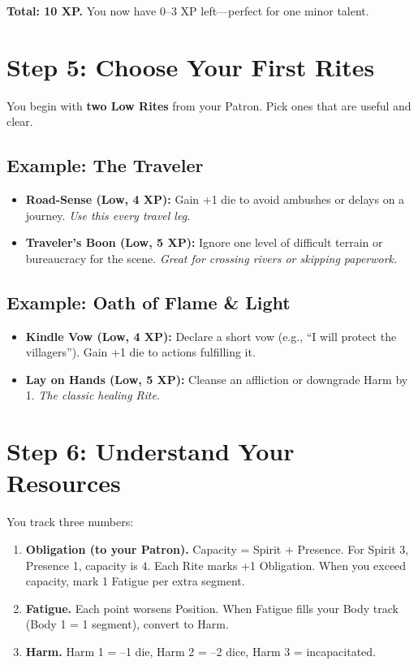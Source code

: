 \textbf{Total: 10 XP.} You now have 0--3 XP left---perfect for one minor talent.

\section{Step 5: Choose Your First Rites}

You begin with \textbf{two Low Rites} from your Patron. Pick ones that are useful and clear.

\subsection*{Example: The Traveler}
\begin{itemize}
  \item \textbf{Road-Sense (Low, 4 XP):} Gain +1 die to avoid ambushes or delays on a journey. \textit{Use this every travel leg.}
  \item \textbf{Traveler's Boon (Low, 5 XP):} Ignore one level of difficult terrain or bureaucracy for the scene. \textit{Great for crossing rivers or skipping paperwork.}
\end{itemize}

\subsection*{Example: Oath of Flame \& Light}
\begin{itemize}
  \item \textbf{Kindle Vow (Low, 4 XP):} Declare a short vow (e.g., ``I will protect the villagers''). Gain +1 die to actions fulfilling it.
  \item \textbf{Lay on Hands (Low, 5 XP):} Cleanse an affliction or downgrade Harm by 1. \textit{The classic healing Rite.}
\end{itemize}

\section{Step 6: Understand Your Resources}

You track three numbers:

\begin{enumerate}
  \item \textbf{Obligation (to your Patron).} Capacity = Spirit + Presence. For Spirit 3, Presence 1, capacity is 4. Each Rite marks +1 Obligation. When you exceed capacity, mark 1 Fatigue per extra segment.
  \item \textbf{Fatigue.} Each point worsens Position. When Fatigue fills your Body track (Body 1 = 1 segment), convert to Harm.
  \item \textbf{Harm.} Harm 1 = --1 die, Harm 2 = --2 dice, Harm 3 = incapacitated.
\end{enumerate}

